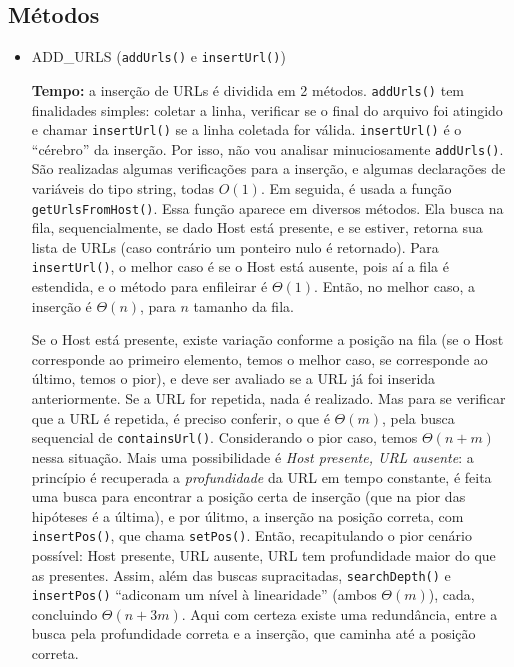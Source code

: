 \documentclass{article}
\def\code#1{\texttt{#1}}
\begin{document}
\subsection{Métodos}

\begin{itemize}

    \item ADD\_URLS (\code{addUrls()} e \code{insertUrl()})

        \textbf{Tempo:} a inserção de URLs é dividida em 2 métodos. \code{addUrls()} tem finalidades simples: coletar a linha, verificar se o final do arquivo foi atingido e chamar \code{insertUrl()} se a linha coletada for válida. \code{insertUrl()} é o ``cérebro'' da inserção. Por isso, não vou analisar minuciosamente \code{addUrls()}. São realizadas algumas verificações para a inserção, e algumas declarações de variáveis do tipo string, todas \( O(1) \). Em seguida, é usada a função \code{getUrlsFromHost()}. Essa função aparece em diversos métodos. Ela busca na fila, sequencialmente, se dado Host está presente, e se estiver, retorna sua lista de URLs (caso contrário um ponteiro nulo é retornado). Para \code{insertUrl()}, o melhor caso é se o Host está ausente, pois aí a fila é estendida, e o método para enfileirar é \( \Theta(1) \). Então, no melhor caso, a inserção é \( \Theta(n) \), para \( n \) tamanho da fila. 

        Se o Host está presente, existe variação conforme a posição na fila (se o Host corresponde ao primeiro elemento, temos o melhor caso, se corresponde ao último, temos o pior), e deve ser avaliado se a URL já foi inserida anteriormente. Se a URL for repetida, nada é realizado. Mas para se verificar que a URL é repetida, é preciso conferir, o que é \( \Theta(m) \), pela busca sequencial de \code{containsUrl()}. Considerando o pior caso, temos \( \Theta(n+m) \) nessa situação. Mais uma possibilidade é \textit{Host presente, URL ausente}: a princípio é recuperada a \textit{profundidade} da URL em tempo constante, é feita uma busca para encontrar a posição certa de inserção (que na pior das hipóteses é a última), e por úlitmo, a inserção na posição correta, com \code{insertPos()}, que chama \code{setPos()}. Então, recapitulando o pior cenário possível: Host presente, URL ausente, URL tem profundidade maior do que as presentes. Assim, além das buscas supracitadas, \code{searchDepth()} e \code{insertPos()} ``adiconam um nível à linearidade'' (ambos \( \Theta(m) \)), cada, concluindo \( \Theta(n +3m) \). Aqui com certeza existe uma redundância, entre a busca pela profundidade correta e a inserção, que caminha até a posição correta.


\end{itemize}
\end{document}
